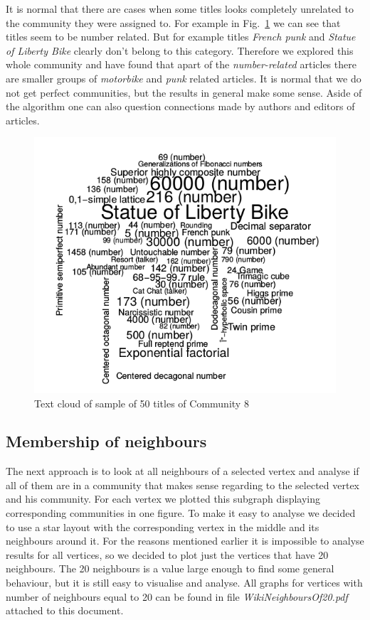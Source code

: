 \documentclass[paper=a4, fontsize=11pt]{scrartcl} %
\begin{document}
It is normal that there are cases when some titles looks completely unrelated to the community they were assigned to. For example in Fig.~\ref{TextCloud8} we can see that titles seem to be number related. But for example titles \textit{French punk} and \textit{Statue of Liberty Bike} clearly don't belong to this category. Therefore we explored this whole community and have found that apart of the \textit{number-related} articles there are smaller groups of \textit{motorbike} and \textit{punk} related articles. It is normal that we do not get perfect communities, but the results in general make some sense. Aside of the algorithm one can also question connections made by authors and editors of articles.
\begin{figure}[H]
	\centering
	\includegraphics[scale=0.75,keepaspectratio]{TextCloud8}
	\caption{Text cloud of sample of 50 titles of Community 8}
	\label{TextCloud8}
\end{figure}

\subsection{Membership of neighbours}
The next approach is to look at all neighbours of a selected vertex and analyse if all of them are in a community that makes sense regarding to the selected vertex and his community. For each vertex we plotted this subgraph displaying corresponding communities in one figure. To make it easy to analyse we decided to use a star layout with the corresponding vertex in the middle and its neighbours around it. For the reasons mentioned earlier it is impossible to analyse results for all vertices, so we decided to plot just the vertices that have 20 neighbours. The 20 neighbours is a value large enough to find some general behaviour, but it is still easy to visualise and analyse. All graphs for vertices with number of neighbours equal to 20 can be found in file \textit{WikiNeighboursOf20.pdf} attached to this document.
\end{document}
